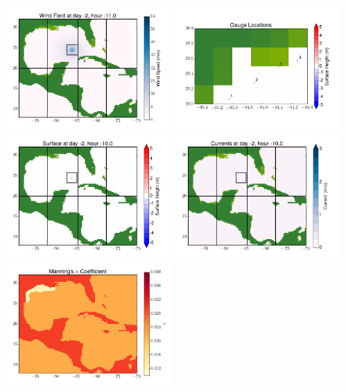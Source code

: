 \documentclass[11pt]{article}
\begin{document}
\vskip 10pt 
\includegraphics[width=0.475\textwidth]{frame0013fig9.png}
\includegraphics[width=0.475\textwidth]{frame0013fig10.png}
\vskip 10pt 
\includegraphics[width=0.475\textwidth]{frame0014fig1.png}
\includegraphics[width=0.475\textwidth]{frame0014fig2.png}
\vskip 10pt 
\includegraphics[width=0.475\textwidth]{frame0014fig3.png}
\end{document}
